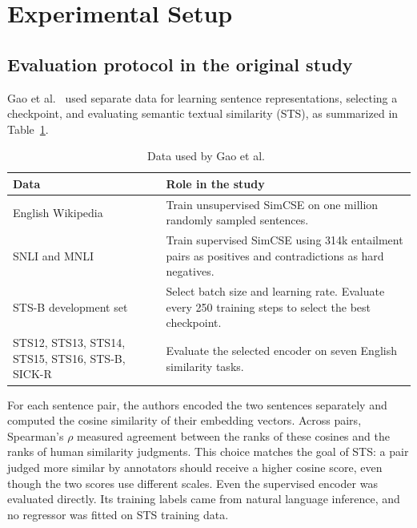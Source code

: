 \section{Experimental Setup}
\label{sec:setup}
\subsection{Evaluation protocol in the original study}
Gao et al.~\cite{gao-etal-2021-simcse} used separate data for learning
sentence representations, selecting a checkpoint, and evaluating semantic
textual similarity (STS), as summarized in Table~\ref{tab:paper-data}.

\begin{table}[htbp]
\caption{Data used by Gao et al.~\cite{gao-etal-2021-simcse}}
\label{tab:paper-data}
\centering\footnotesize
\begin{tabular}{@{}p{}p{}@{}}
\hline
Data & Role in the study \\
\hline
English Wikipedia & Train unsupervised SimCSE on one million randomly sampled sentences. \\
SNLI and MNLI & Train supervised SimCSE using 314k entailment pairs as positives and contradictions as hard negatives. \\
STS-B development set & Select batch size and learning rate. Evaluate every 250 training steps to select the best checkpoint. \\
STS12, STS13, STS14, STS15, STS16, STS-B, SICK-R & Evaluate the selected encoder on seven English similarity tasks. \\
\hline
\end{tabular}
\end{table}

For each sentence pair, the authors encoded the two sentences separately
and computed the cosine similarity of their embedding vectors. Across
pairs, Spearman's $\rho$ measured agreement between the ranks of these
cosines and the ranks of human similarity judgments. This choice matches
the goal of STS: a pair judged more similar by annotators should receive a
higher cosine score, even though the two scores use different scales.
Even the supervised
encoder was evaluated directly. Its training labels came from natural
language inference, and no regressor was fitted on STS training data.

